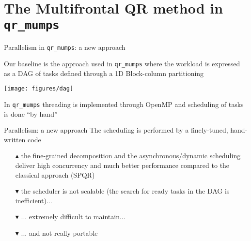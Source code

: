 \documentclass{beamer}
\newcommand{\qrm}{\texttt{qr\_mumps}\xspace}
\newcommand{\dr}[1]{\textcolor{amred}{#1}}
\newcommand{\db}[1]{\textcolor{amblu}{#1}}
\begin{document}
\part{The Multifrontal QR method in \qrm}

\begin{frame}[plain]
  \partpage
\end{frame}

\begin{frame}{Parallelism in \qrm: a new approach}

  Our baseline is the approach used in \alert{\qrm} where the
  workload is expressed as a \alert{DAG} of tasks defined through a
  \alert{1D Block-column} partitioning

  \begin{center}
    \texttt{[image: figures/dag]}
  \end{center}

  In \qrm threading is implemented through OpenMP and scheduling of
  tasks is done ``by hand''

\end{frame}

\begin{frame}{Parallelism: a new approach}
  The \db{scheduling} is performed by a \db{finely-tuned, hand-written code}

  \begin{itemize}
  \item[\db{$\blacktriangle$}] the fine-grained decomposition and the
    asynchronous/dynamic scheduling deliver high concurrency and much
    better performance compared to the classical approach (SPQR)
  \item[\dr{$\blacktriangledown$}] the scheduler is not scalable (the search
    for ready tasks in the DAG is inefficient)...
  \item[\dr{$\blacktriangledown$}] ... extremely difficult to maintain...
  \item[\dr{$\blacktriangledown$}] ... and not really portable
  \end{itemize}

  \vspace{1cm}

\end{frame}

\end{document}
